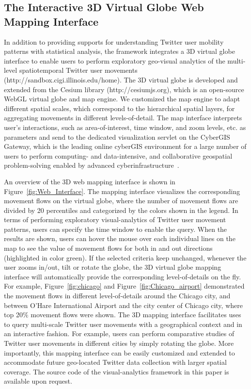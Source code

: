 \documentclass[ijgi,article,accept,moreauthors,pdftex,10pt,a4paper]{mdpi}
\theoremstyle{mdpi}
\newcounter{ex}
\newcounter{re}
\theoremstyle{mdpidefinition}
\begin{document}
\subsection{The Interactive 3D Virtual Globe Web Mapping Interface}
In addition to providing supports for understanding Twitter user mobility patterns with statistical analysis, the framework integrates a 3D virtual globe interface to enable users to perform exploratory geo-visual analytics of the multi-level spatiotemporal Twitter user movements (http://sandbox.cigi.illinois.edu/home). 
The 3D virtual globe is developed and extended from the Cesium library (http://cesiumjs.org), which is an open-source WebGL virtual globe and map engine.
We customized the map engine to adapt different spatial scales, which correspond to the hierarchical spatial layers, for aggregating movements in different levels-of-detail.
The map interface interprets user's interactions, such as area-of-interest, time window, and zoom levels, etc. as parameters and send to the dedicated visualization servlet on the CyberGIS Gateway, which is the leading online cyberGIS environment for a large number of users to perform computing- and data-intensive, and collaborative geospatial problem-solving enabled by advanced cyberinfrastructure~\cite{liu2014cybergis}.

An overview of the 3D web mapping interface is shown in Figure~\ref{fig:Web_Interface}.
The mapping interface visualizes the corresponding movement flows on the virtual globe, where the number of movement flows are divided by 20 percentiles and categorized by the colors shown in the legend.
In terms of performing exploratory visual-analytics of Twitter user movement patterns, users can specify the time window to enable the query. 
When the results are shown, users can hover the mouse over each individual lines on the map to see the value of movement flows for both in and out directions (highlighted in color green).
If the selected criteria keep unchanged, whenever the user zooms in/out, tilt or rotate the globe, the 3D virtual globe mapping interface will automatically provide the corresponding level-of-details on the fly.
For example, Figure~\ref{fig:chicago} and Figure~\ref{fig:Chicago_airport} demonstrated the movement flows in different level-of-details around the Chicago city, and between O'Hare International Airport and the city center of Chicago city, where top 20$\%$ movement flows were shown.
The 3D mapping interface facilitates uses to query multi-scale Twitter user movements with a geographical context and in an interactive fashion.
For example, users can perform comparative studies of Twitter user movements in different cities by simply rotating the globe. 
More importantly, this mapping interface can be easily customized and extended to accommodate future geo-located Twitter data collection with larger spatial coverage.
The source code of the visual-analytics framework in this paper is available upon request.
\end{document}
